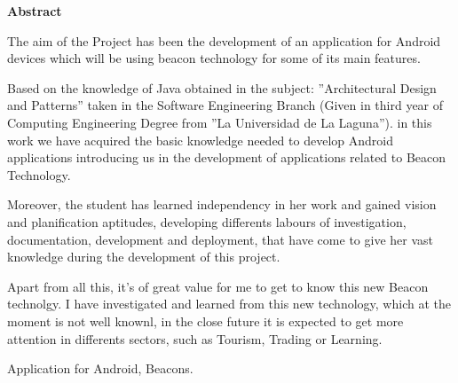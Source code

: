 \documentclass[spanish,a4paper,14pt,oneside]{extreport}
\newenvironment{summary}
{\par\noindent\begin{center}\textbf{Abstract}\end{center}\begin{itshape}\par\noindent}
{\end{itshape}}
\newenvironment{keywords}
{\begin{list}{}{\setlength{\leftmargin}{1em}}\item[\hskip\labelsep \bfseries Keywords:]}
{\end{list}}
\begin{document}
\newpage  %
\begin{summary}
{\em

The aim of the Project has been the development of an application for Android devices which will be using beacon technology for some of its main features.

\bigskip
Based on the knowledge of Java obtained in the subject: ''Architectural Design and Patterns'' taken in the
Software Engineering Branch (Given in third year of Computing Engineering Degree from ''La Universidad de La Laguna''). 
in this work we have acquired the basic knowledge needed to
develop Android applications introducing us in the development of applications related to Beacon Technology.

\bigskip
Moreover, the student has learned independency in her work and gained vision and planification aptitudes, developing differents labours of investigation, documentation, development and deployment, that have come to give her vast knowledge during the development of this project.

\bigskip
Apart from all this, it's of great value for me to get to know this new Beacon technolgy. I have investigated and learned from this new technology, which at the moment is not well knownl, in the close future it is expected to get more attention in differents sectors, such as Tourism, Trading or Learning.
}

\begin{keywords}
Application for Android, Beacons.
\end{keywords}

\end{summary}

\newpage{\pagestyle{empty}}
\thispagestyle{empty}



\pagestyle{myheadings} %

\renewcommand{\thepage}{\roman{page}}
\setcounter{page}{1}
\end{document}
